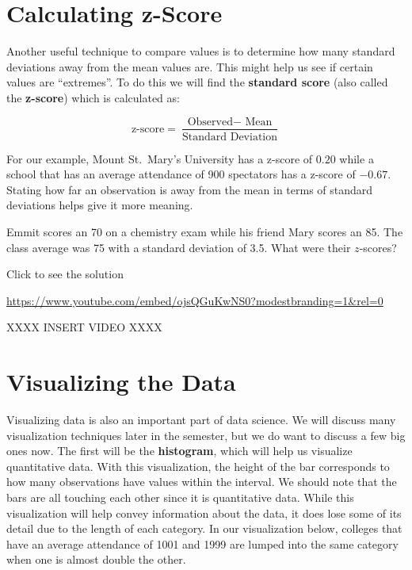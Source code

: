 \documentclass[
  letterpaper,
  DIV=11,
  numbers=noendperiod]{scrreprt}
\begin{document}
\section{Calculating z-Score}\label{calculating-z-score}

Another useful technique to compare values is to determine how many
standard deviations away from the mean values are. This might help us
see if certain values are ``extremes''. To do this we will find the
\textbf{standard score} (also called the \textbf{z-score}) which is
calculated as:

\[
\text{z-score}=\frac{\text{Observed} - \text{ Mean}}{\text{Standard Deviation}}
\]

For our example, Mount St.~Mary's University has a z-score of \(0.20\)
while a school that has an average attendance of 900 spectators has a
z-score of \(-0.67\). Stating how far an observation is away from the
mean in terms of standard deviations helps give it more meaning.

\begin{tcolorbox}[enhanced jigsaw, leftrule=.75mm, arc=.35mm, coltitle=black, rightrule=.15mm, bottomrule=.15mm, toprule=.15mm, left=2mm, colbacktitle=quarto-callout-tip-color!10!white, title=\textcolor{quarto-callout-tip-color}{\faLightbulb}\hspace{0.5em}{Try it Out}, toptitle=1mm, breakable, colframe=quarto-callout-tip-color-frame, bottomtitle=1mm, titlerule=0mm, colback=white, opacityback=0, opacitybacktitle=0.6]

Emmit scores an 70 on a chemistry exam while his friend Mary scores an
85. The class average was 75 with a standard deviation of 3.5. What were
their \(z\)-scores?

Click to see the solution

\url{https://www.youtube.com/embed/ojsQGuKwNS0?modestbranding=1&rel=0}

XXXX INSERT VIDEO XXXX

\end{tcolorbox}

\section{Visualizing the Data}\label{visualizing-the-data}

Visualizing data is also an important part of data science. We will
discuss many visualization techniques later in the semester, but we do
want to discuss a few big ones now. The first will be the
\textbf{histogram}, which will help us visualize quantitative data. With
this visualization, the height of the bar corresponds to how many
observations have values within the interval. We should note that the
bars are all touching each other since it is quantitative data. While
this visualization will help convey information about the data, it does
lose some of its detail due to the length of each category. In our
visualization below, colleges that have an average attendance of 1001
and 1999 are lumped into the same category when one is almost double the
other.
\end{document}
